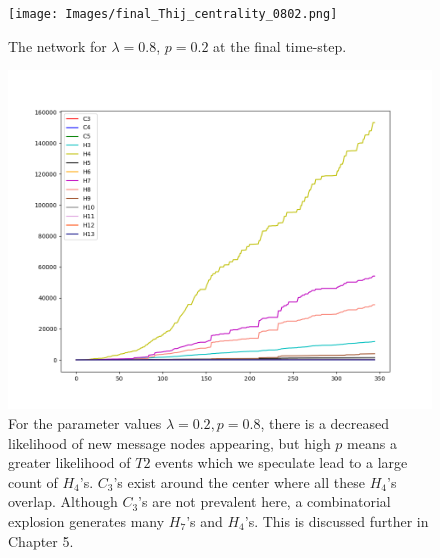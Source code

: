\begin{figure}[h!]
    \texttt{[image: Images/final\_Thij\_centrality\_0802.png]}
    \centering
    \caption{The network for $\lambda=0.8$, $p=0.2$ at the final time-step.}
    \label{fig:network0802}
\end{figure}

\clearpage

\begin{figure}[h!]
    \includegraphics[width=\linewidth]{Images/twitter_sim_for_stats_3_0.2_0.8.png}
    \centering
    \caption{For the parameter values $\lambda=0.2, p=0.8$, there is a decreased likelihood of new message nodes appearing, but 
    high $p$ means a greater likelihood of $T2$ events which we speculate lead to a large
    count of $H_{4}$'s. $C_3$'s exist around the center where all these $H_{4}$'s
    overlap. Although $C_{3}$'s are not prevalent here, a combinatorial explosion generates 
    many $H_{7}$'s and $H_{4}$'s. This is discussed further in Chapter 5.}
    \label{fig:thij0208}
\end{figure}


